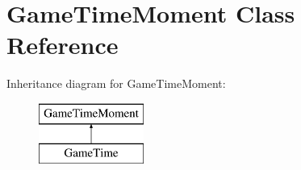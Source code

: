 \hypertarget{class_game_time_moment}{}\section{Game\+Time\+Moment Class Reference}
\label{class_game_time_moment}
Inheritance diagram for Game\+Time\+Moment\+:\begin{figure}[H]
\begin{center}
\leavevmode
\includegraphics[height=2.000000cm]{class_game_time_moment}
\end{center}
\end{figure}
